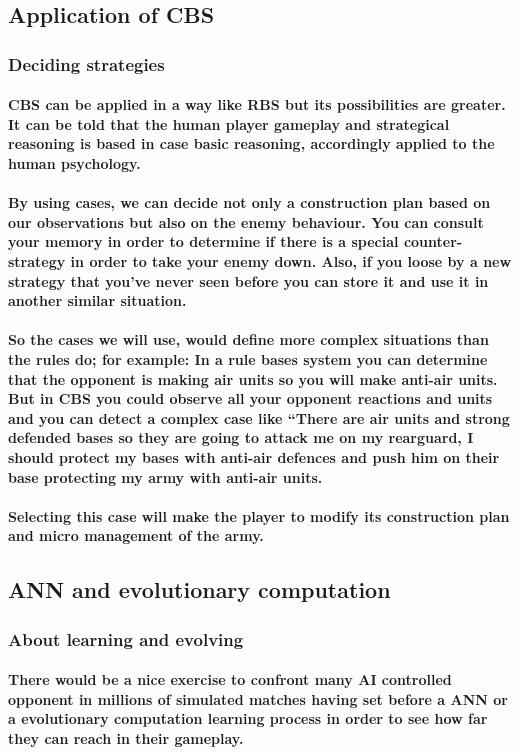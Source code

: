 \documentclass[a4paper,10pt]{article}
\newcommand{\p}[1]{\paragraph{\indent\textnormal{#1}}}
\begin{document}
\subsection{Application of CBS}

\subsubsection{Deciding strategies}
  \p{CBS can be applied in a way like RBS but its possibilities are greater. It can be told that the human player gameplay and strategical reasoning is based in case basic reasoning, accordingly applied to the human psychology.}

  \p{By using cases, we can decide not only a construction plan based on our observations but also on the enemy behaviour. You can consult your memory in order to determine if there is a special counter-strategy in order to take your enemy down. Also, if you loose by a new strategy that you've never seen before you can store it and use it in another similar situation.}

  \p{So the cases we will use, would define more complex situations than the rules do; for example: In a rule bases system you can determine that the opponent is making air units so you will make anti-air units. But in CBS you could observe all your opponent reactions and units and you can detect a complex case like ``There are air units and strong defended bases so they are going to attack me on my rearguard, I should protect my bases with anti-air defences and push him on their base protecting my army with anti-air units.}

  \p{Selecting this case will make the player to modify its construction plan and micro management of the army.}

\subsection{ANN and evolutionary computation}

\subsubsection{About learning and evolving}

\p{There would be a nice exercise to confront many AI controlled opponent in millions of simulated matches having set before a ANN or a evolutionary computation learning process in order to see how far they can reach in their gameplay.}
\end{document}

